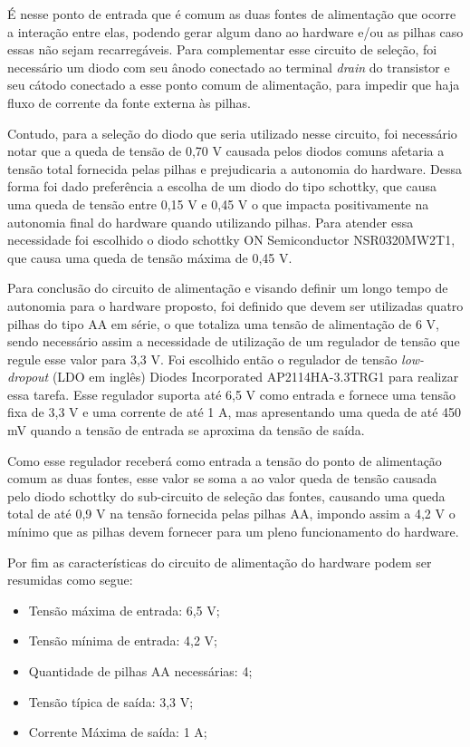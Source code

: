 É nesse ponto de entrada que é comum as duas fontes de alimentação que ocorre a interação entre elas, podendo gerar algum dano ao hardware e/ou as pilhas caso essas não sejam recarregáveis. Para complementar esse circuito de seleção, foi necessário um diodo com seu ânodo conectado ao terminal \textit{drain} do transistor e seu cátodo conectado a esse ponto comum de alimentação, para impedir que haja fluxo de corrente da fonte externa às pilhas. 

Contudo, para a seleção do diodo que seria utilizado nesse circuito, foi necessário notar que a queda de tensão de 0,70 V causada pelos diodos comuns afetaria a tensão total fornecida pelas pilhas e prejudicaria a autonomia do hardware. Dessa forma foi dado preferência a escolha de um diodo do tipo schottky, que causa uma queda de tensão entre 0,15 V e 0,45 V o que impacta positivamente na autonomia final do hardware quando utilizando pilhas. Para atender essa necessidade foi escolhido o diodo schottky ON Semiconductor NSR0320MW2T1, que causa uma queda de tensão máxima de 0,45 V.

Para conclusão do circuito de alimentação e visando definir um longo tempo de autonomia para o hardware proposto, foi definido que devem ser utilizadas quatro pilhas do tipo AA em série, o que totaliza uma tensão de alimentação de 6 V, sendo necessário assim a necessidade de utilização de um regulador de tensão que regule esse valor para 3,3 V. Foi escolhido então o regulador de tensão \textit{low-dropout} (LDO em inglês) Diodes Incorporated AP2114HA-3.3TRG1 para realizar essa tarefa. Esse regulador suporta até 6,5 V como entrada e fornece uma tensão fixa de 3,3 V e uma corrente de até 1 A, mas apresentando uma queda de até 450 mV quando a tensão de entrada se aproxima da tensão de saída. 

Como esse regulador receberá como entrada a tensão do ponto de alimentação comum as duas fontes, esse valor se soma a ao valor queda de tensão causada pelo diodo schottky do sub-circuito de seleção das fontes, causando uma queda total de até 0,9 V na tensão fornecida pelas pilhas AA, impondo assim a 4,2 V o mínimo que as pilhas devem fornecer para um pleno funcionamento do hardware. 


Por fim as características do circuito de alimentação do hardware podem ser resumidas como segue:

\begin{itemize}
    \item Tensão máxima de entrada: 6,5 V;
    \item Tensão mínima de entrada: 4,2 V;
    \item Quantidade de pilhas AA necessárias: 4;
    \item Tensão típica de saída: 3,3 V;
    \item Corrente Máxima de saída: 1 A;
\end{itemize}


